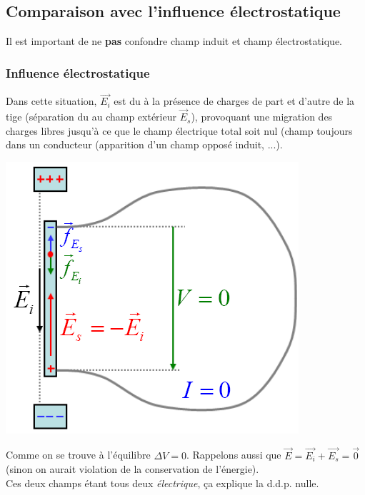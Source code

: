 \documentclass	[11pt, a4paper, openany]{book}
\begin{document}
\subsection{Comparaison avec l'influence électrostatique}
Il est important de ne \textbf{pas} confondre champ induit et champ électrostatique.
\subsubsection*{Influence électrostatique}
Dans cette situation, $\vec{E_i}$ est du à la présence de charges de part et d'autre de la tige (séparation du au champ extérieur $\vec{E}_s$), provoquant une migration des charges libres jusqu'à ce que le champ électrique total soit nul (champ toujours dans un conducteur (apparition d'un champ opposé induit, ...).
\begin{center}
	\includegraphics[scale=0.45]{em/image5.png}\\
\end{center}
Comme on se trouve à l'équilibre $\Delta V = 0$. Rappelons aussi que $\vec{E} = \vec{E_i} + \vec{E_s} = \vec{0}$ (sinon on aurait violation de la conservation de l'énergie).\\
Ces deux champs étant tous deux \textit{électrique}, ça explique la d.d.p. nulle.
\end{document}
